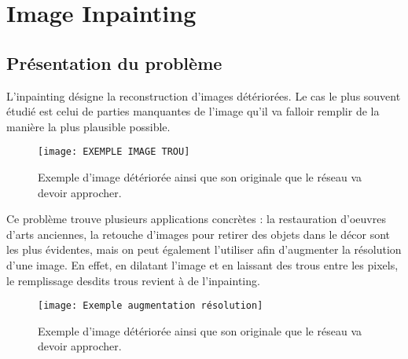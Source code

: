 \chapter{Image Inpainting}

\section{Présentation du problème}

L'inpainting désigne la reconstruction d'images détériorées. Le cas le plus souvent étudié est celui de parties manquantes de l'image qu'il va falloir remplir de la manière la plus plausible possible.

\begin{figure}[!h]
    \centering
    \texttt{[image: EXEMPLE IMAGE TROU]}
    \caption{Exemple d'image détériorée ainsi que son originale que le réseau va devoir approcher.}
\end{figure}

Ce problème trouve plusieurs applications concrètes : la restauration d'oeuvres d'arts anciennes, la retouche d'images pour retirer des objets dans le décor sont les plus évidentes, mais on peut également l'utiliser afin d'augmenter la résolution d'une image. En effet, en dilatant l'image et en laissant des trous entre les pixels, le remplissage desdits trous revient à de l'inpainting.

\begin{figure}[!h]
    \centering
    \texttt{[image: Exemple augmentation résolution]}
    \caption{Exemple d'image détériorée ainsi que son originale que le réseau va devoir approcher.}
\end{figure}